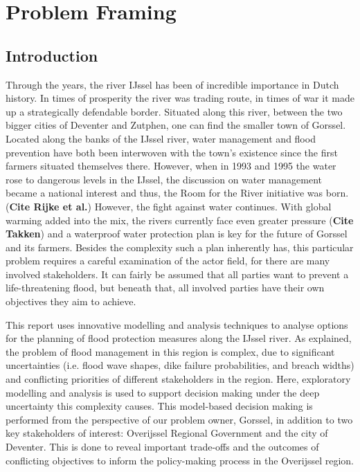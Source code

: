 \section{Problem Framing}
\label{s:prob_frame}
\subsection{Introduction}
Through the years, the river IJssel has been of incredible importance in Dutch history. In times of prosperity the river was trading route, in times of war it made up a strategically defendable border. Situated along this river, between the two bigger cities of Deventer and Zutphen, one can find the smaller town of Gorssel. Located along the banks of the IJssel river, water management and flood prevention have both been interwoven with the town's existence since the first farmers situated themselves there. However, when in 1993 and 1995 the water rose to dangerous levels in the IJssel, the discussion on water management became a national interest and thus, the Room for the River initiative was born. (\textbf{Cite Rijke et al.}) However, the fight against water continues. With global warming added into the mix, the rivers currently face even greater pressure (\textbf{Cite Takken}) and a waterproof water protection plan is key for the future of Gorssel and its farmers. Besides the complexity such a plan inherently has, this particular problem requires a careful examination of the actor field, for there are many involved stakeholders. It can fairly be assumed that all parties want to prevent a life-threatening flood, but beneath that, all involved parties have their own objectives they aim to achieve.  

This report uses innovative modelling and analysis techniques to analyse options for the planning of flood protection measures along the IJssel river. As explained, the problem of flood management in this region is complex, due to significant uncertainties (i.e. flood wave shapes, dike failure probabilities, and breach widths) and conflicting priorities of different stakeholders in the region. Here, exploratory modelling and analysis is used to support decision making under the deep uncertainty this complexity causes. This model-based decision making is performed from the perspective of our problem owner, Gorssel, in addition to two key stakeholders of interest: Overijssel Regional Government and the city of Deventer. This is done to reveal important trade-offs and the outcomes of conflicting objectives to inform the policy-making process in the Overijssel region.


